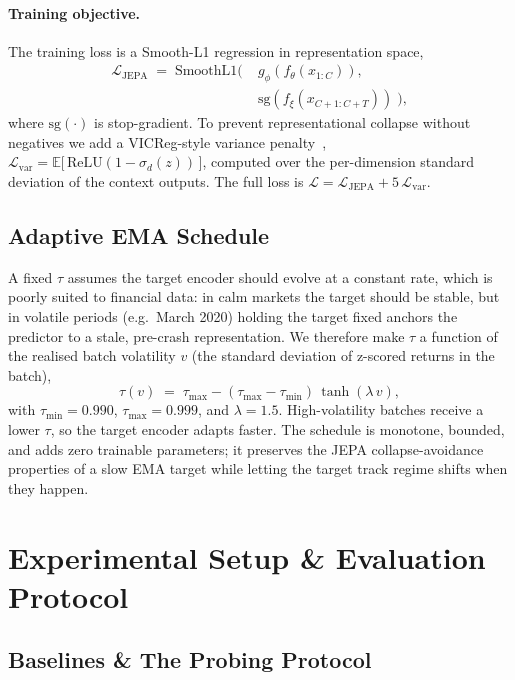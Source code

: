 \documentclass[twocolumn, 10pt]{article}
\begin{document}
\paragraph{Training objective.}
The training loss is a Smooth-L1 regression in representation space,
\[
  \begin{aligned}
    \mathcal{L}_{\text{JEPA}} \;=\; \mathrm{SmoothL1}\big(\;
      & g_\phi(f_\theta(x_{1:C})), \\[-2pt]
      & \mathrm{sg}(f_\xi(x_{C+1:C+T}))\;\big),
  \end{aligned}
\]
where $\mathrm{sg}(\cdot)$ is stop-gradient. To prevent representational
collapse without negatives we add a VICReg-style variance
penalty~\cite{bardes2021vicreg},
$\mathcal{L}_{\text{var}} = \mathbb{E}\big[\,\mathrm{ReLU}(1 -
\sigma_d(z))\,\big]$, computed over the per-dimension standard deviation
of the context outputs. The full loss is
$\mathcal{L} = \mathcal{L}_{\text{JEPA}} + 5\,\mathcal{L}_{\text{var}}$.

\subsection{Adaptive EMA Schedule}
\label{sec:adaptive-ema}

A fixed $\tau$ assumes the target encoder should evolve at a constant
rate, which is poorly suited to financial data: in calm markets the
target should be stable, but in volatile periods (e.g.\ March 2020)
holding the target fixed anchors the predictor to a stale, pre-crash
representation. We therefore make $\tau$ a function of the realised
batch volatility $v$ (the standard deviation of z-scored returns in the
batch),
\[
  \tau(v) \;=\; \tau_{\max} - (\tau_{\max} - \tau_{\min})\,
                 \tanh(\lambda\,v),
\]
with $\tau_{\min}=0.990$, $\tau_{\max}=0.999$, and $\lambda=1.5$.
High-volatility batches receive a lower $\tau$, so the target encoder
adapts faster. The schedule is monotone, bounded, and adds zero
trainable parameters; it preserves the JEPA collapse-avoidance
properties of a slow EMA target while letting the target track regime
shifts when they happen.

\section{Experimental Setup \& Evaluation Protocol}
\label{sec:setup}

\subsection{Baselines \& The Probing Protocol}
\end{document}
